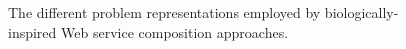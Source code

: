 \begin{figure}
\centerline{
}
\caption{The different problem representations employed by biologically-inspired Web service composition approaches.}
\label{fig:representations}
\end{figure}

